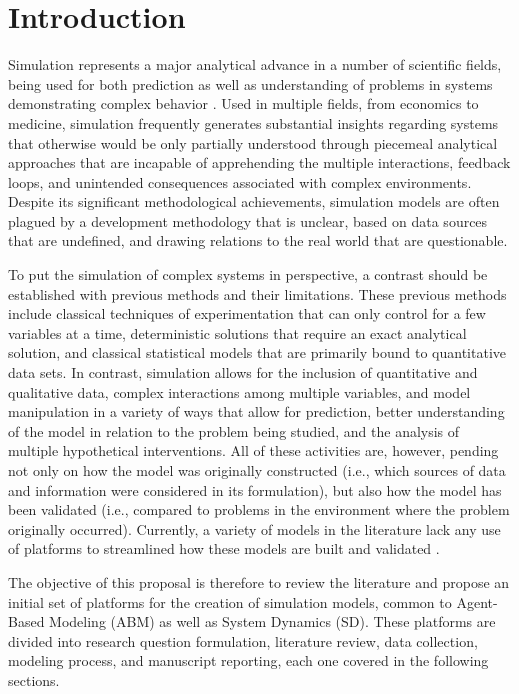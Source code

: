 \documentclass[11pt]{article}
\begin{document}
\newpage

\section{Introduction}

Simulation represents a major analytical advance in a number of scientific fields, being used for both prediction as well as understanding of problems in systems demonstrating complex behavior \cite{Giere2009}. Used in multiple fields, from economics to medicine, simulation frequently generates substantial insights regarding systems that otherwise would be only partially understood through piecemeal analytical approaches that are incapable of apprehending the multiple interactions, feedback loops, and unintended consequences associated with complex environments.  Despite its significant methodological achievements, simulation models are often plagued by a development methodology that is unclear, based on data sources that are undefined, and drawing relations to the real world that are questionable.
	
To put the simulation of complex systems in perspective, a contrast should be established with previous methods and their limitations.  These previous methods include classical techniques of experimentation that can only control for a few variables at a time, deterministic solutions that require an exact analytical solution, and classical statistical models that are primarily bound to quantitative data sets. In contrast, simulation allows for the inclusion of quantitative and qualitative data, complex interactions among multiple variables, and model manipulation in a variety of ways that allow for prediction, better understanding of the model in relation to the problem being studied, and the analysis of multiple hypothetical interventions.  All of these activities are, however, pending not only on how the model was originally constructed (i.e., which sources of data and information were considered in its formulation), but also how the model has been validated (i.e., compared to problems in the environment where the problem originally occurred).  Currently, a variety of models in the literature lack any use of platforms to streamlined how these models are built and validated \cite{Rand2006}.

The objective of this proposal is therefore to review the literature and propose an initial set of platforms for the creation of simulation models, common to Agent-Based Modeling (ABM) as well as System Dynamics (SD).  These platforms are divided into research question formulation, literature review, data collection, modeling process, and manuscript reporting, each one covered in the following sections.
\end{document}
